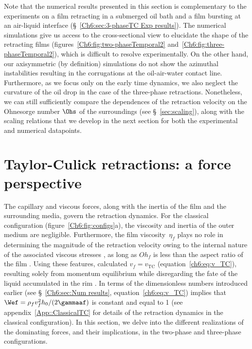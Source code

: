Note that the numerical results presented in this section is complementary to the experiments on a film retracting in a submerged oil bath \citep[two-phase case,][]{reyssat-2006-epl} and a film bursting at an air-liquid interface (\S~\ref{Ch6:sec:3-phaseTC Exp results}). The numerical simulations give us access to the cross-sectional view to elucidate the shape of the retracting films (figures~\ref{Ch6:fig:two-phaseTemporal2} and~\ref{Ch6:fig:three-phaseTemporal2}), which is difficult to resolve experimentally. On the other hand, our axisymmetric (by definition) simulations do not show the azimuthal instabilities resulting in the corrugations at the oil-air-water contact line. Furthermore, as we focus only on the early time dynamics, we also neglect the curvature of the oil drop in the case of the three-phase retractions. Nonetheless, we can still sufficiently compare the dependences of the retraction velocity on the Ohnesorge number $\Ohs$ of the surroundings (see \S~\ref{sec:scaling}), along with the scaling relations that we develop in the next section for both the experimental and numerical datapoints. 

\section{Taylor-Culick retractions: a force perspective}
\label{sec:forces}

The capillary and viscous forces, along with the inertia of the film and the surrounding media, govern the retraction dynamics. For the classical configuration (figure~\ref{Ch6:fig:configs}a), the viscosity and inertia of the outer medium are negligible. Furthermore, the film viscosity~$\eta_f$ plays no role in determining the magnitude of the retraction velocity owing to the internal nature of the associated viscous stresses \citep{savva-2009-jfm}, as long as $Oh_{f}$ is less than the aspect ratio of the film \citep[see][]{deka2020revisiting}. Using these features, \citet{taylor-1959-procrsoclonda} calculated $v_f = v_{\text{TC}}$ (equation~\eqref{ch6:eq:v_TC}), resulting solely from momentum equilibrium while disregarding the fate of the liquid accumulated in the rim \citep{villermaux2020fragmentation}. In terms of the dimensionless numbers introduced earlier (see \S~\ref{Ch6:sec:Num results}, equation~\eqref{ch6:eq:v_TC}) implies that $\Wef = \rho_fv_f^2h_0/(2\gammaaf)$ is constant and equal to 1 (see appendix~\ref{App::ClassicalTC} for details of the retraction dynamics in the classical configuration). In this section, we delve into the different realizations of the dominating forces, and their implications, in the two-phase and three-phase configurations.  

